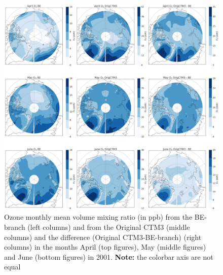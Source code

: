 \begin{figure}[h]
    \centering
    \includegraphics[width = \linewidth]{Chapter6_Results/images/Orig_BE_comp/polar_VMRperc_AprJune_2001.png}
    \caption{Ozone monthly mean volume mixing ratio (in ppb) from the BE-branch (left columns) and from the Original CTM3 (middle columns) and the difference (Original CTM3-BE-branch) (right columns) in the months April (top figures), May (middle figures) and June (bottom figures) in 2001. \textbf{Note:} the colorbar axis are not equal}
    \label{fig:BE_origPD_vmrperc_AprJune}
\end{figure}